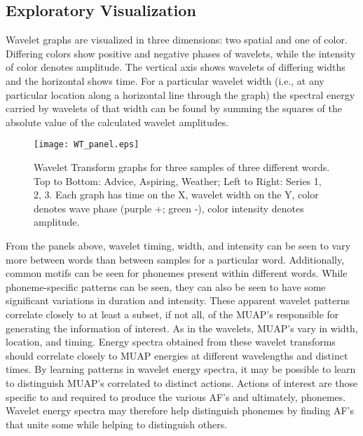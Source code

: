 \documentclass[conference]{IEEEtran}
\begin{document}
\subsection{Exploratory Visualization}
Wavelet graphs are visualized in three dimensions: two spatial and one of color. Differing colors show positive and negative phases of wavelets, while the intensity of color denotes amplitude. The vertical axis shows wavelets of differing widths and the horizontal shows time. For a particular wavelet width (i.e., at any particular location along a horizontal line through the graph) the spectral energy carried by wavelets of that width can be found by summing the squares of the absolute value of the calculated wavelet amplitudes.

\begin{figure}[!t]
\centering
\texttt{[image: WT\_panel.eps]}
\caption{Wavelet Transform graphs for three samples of three different words. Top to Bottom: Advice, Aspiring, Weather; Left to Right: Series 1, 2, 3. Each graph has time on the X, wavelet width on the Y, color denotes wave phase (purple +; green -), color intensity denotes amplitude.}
\label{fig_WT}
\end{figure}

From the panels above, wavelet timing, width, and intensity can be seen to vary more between words than between samples for a particular word. Additionally, common motifs can be seen for phonemes present within different words. While phoneme-specific patterns can be seen, they can also be seen to have some significant variations in duration and intensity. These apparent wavelet patterns correlate closely to at least a subset, if not all, of the MUAP's responsible for generating the information of interest. As in the wavelets, MUAP's vary in width, location, and timing. Energy spectra obtained from these wavelet transforms should correlate closely to MUAP energies at different wavelengths and distinct times. By learning patterns in wavelet energy spectra, it may be possible to learn to distinguish MUAP's correlated to distinct actions. Actions of interest are those specific to and required to produce the various AF's and ultimately, phonemes. Wavelet energy spectra may therefore help distinguish phonemes by finding AF's that unite some while helping to distinguish others.
\end{document}
